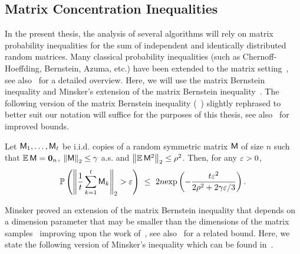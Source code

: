 \subsection{Matrix Concentration Inequalities}
%
%
In the present thesis, the analysis of several algorithms will rely on matrix probability inequalities for the sum of independent and identically distributed random matrices. Many classical probability inequalities (such as Chernoff-Hoeffding, Bernstein, Azuma, etc.) have been extended to the matrix setting~\cite{chernoff:matrix_valued:AW,chernoff:matrix_valued:Tropp}, see also~\cite{Tropp:nips} for a detailed overview. Here, we will use the matrix Bernstein inequality and Minsker's extension of the matrix Bernstein inequality~\cite{minsker}. The following version of the matrix Bernstein inequality (~\cite[Theorem~$3.2$]{recht:simple_completion}) slightly rephrased to better suit our notation will suffice for the purposes of this thesis, see also~\cite{chernoff:matrix_valued:Tropp} for improved bounds.
%
\begin{theorem}\label{thm:matrix_valued:Bernstein}
Let ${\mathsf{M} }_1,\ldots ,{\mathsf{M} }_t$ be i.i.d. copies of a random symmetric matrix ${\mathsf{M} }$ of size $n$ such that $\operatorname{\mathbb{E}}{ {\mathsf{M} }}=\mathbf{0}_n $, $\left\|{\mathsf{M} }\right\|_2\leq \gamma$ a.s. and $\left\|\operatorname{\mathbb{E}} {\mathsf{M} }^2 \right\|_2 \leq \rho^2$. Then, for any $\varepsilon > 0$,
%
\begin{equation}\label{ineq:matrix_Bernstein}
\mathbb{P}\left( \left\|\frac{1}{t} \sum_{k=1}^{t} {\mathsf{M} }_k \right\|_2 > \varepsilon \right) \ \leq\ 2n \hbox{\textrm exp}\left(-\frac{t\varepsilon^2}{2\rho^2 + 2\gamma \varepsilon/3}\right).
\end{equation}
%
\end{theorem}
%
%
Minsker proved an extension of the matrix Bernstein inequality that depends on a dimension parameter that may be smaller than the dimensions of the matrix samples~\cite{minsker} improving upon the work of~\cite{HKZ12}, see also~\cite{Oliv10} for a related bound. Here, we state the following version of Minsker's inequality which can be found in~\cite{Tropp:nips}.
